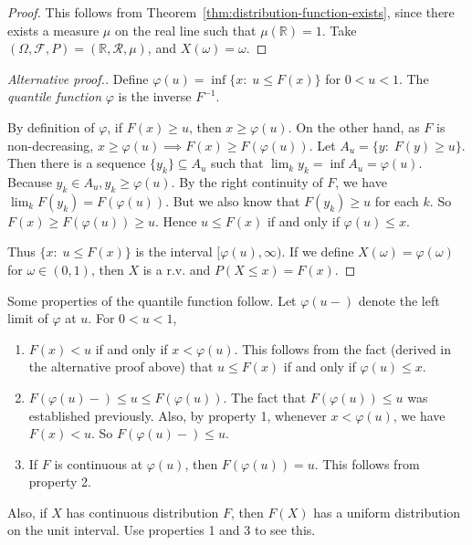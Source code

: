 \documentclass[11pt,fleqn]{book} %
\begin{document}
\begin{proof}
	This follows from Theorem~\ref{thm:distribution-function-exists}, since there exists a measure $\mu$ on the real line such that $\mu(\mathbb{R}) = 1$. Take $(\Omega,\mathcal{F},P) = (\mathbb{R},\mathcal{R},\mu)$, and $X(\omega) = \omega$.
\end{proof}

\begin{proof}[Alternative proof.]
	Define $\varphi(u) = \inf\{x:\;u \leq F(x)\}$ for $0<u<1$. The \emph{quantile function} $\varphi$ is the inverse $F^{-1}$.

	By definition of $\varphi$, if $F(x) \geq u$, then $x \geq \varphi(u)$. On the other hand, as $F$ is non-decreasing, $x \geq \varphi(u) \implies F(x) \geq F(\varphi(u))$. Let $A_u = \{y:\;F(y) \geq u\}$. Then there is a sequence $\{y_k\} \subseteq A_u$ such that $\lim_k y_k = \inf A_u = \varphi(u)$. Because $y_k \in A_u, y_k \geq \varphi(u)$. By the right continuity of $F$, we have $\lim_k F(y_k) = F(\varphi(u))$. But we also know that $F(y_k) \geq u$ for each $k$. So $F(x) \geq F(\varphi(u)) \geq u$. Hence $u \leq F(x)$ if and only if $\varphi(u) \leq x$.

	Thus $\{x:\;u \leq F(x)\}$ is the interval $[\varphi(u),\infty)$. If we define $X(\omega) = \varphi(\omega)$ for $\omega \in (0,1)$, then $X$ is a r.v. and $P(X \leq x) = F(x)$.
\end{proof}

Some properties of the quantile function follow. Let $\varphi(u-)$ denote the left limit of $\varphi$ at $u$. For $0<u<1$,
\begin{enumerate}[label=\arabic*.]
	\item $F(x) < u$ if and only if $x < \varphi(u)$. This follows from the fact (derived in the alternative proof above) that $u \leq F(x)$ if and only if $\varphi(u) \leq x$.
	\item $F(\varphi(u)-) \leq u \leq F(\varphi(u))$. The fact that $F(\varphi(u)) \leq u$ was established previously. Also, by property 1, whenever $x < \varphi(u)$, we have $F(x) < u$. So $F(\varphi(u)-) \leq u$.
	\item If $F$ is continuous at $\varphi(u)$, then $F(\varphi(u)) = u$. This follows from property 2.
\end{enumerate}

Also, if $X$ has continuous distribution $F$, then $F(X)$ has a uniform distribution on the unit interval. Use properties 1 and 3 to see this.
\vspace{10pt}
\end{document}
